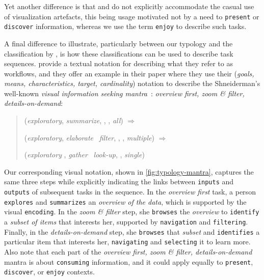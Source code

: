 Yet another difference is that \citet{Roth2013} and \citet{Schulz2013} do not explicitly accommodate the casual use of visualization artefacts, this being usage motivated not by a need to {\tt present} or {\tt discover} information, whereas we use the term {\tt enjoy} to describe such tasks.

A final difference to illustrate, particularly between our typology and the classification by \citet{Schulz2013}, is how these classifications can be used to describe task sequences.
\citet{Schulz2013} provide a textual notation for describing what they refer to as workflows, and they offer an example in their paper where they use their ({\it goals, means, characteristics, target, cardinality}) notation to describe the Shneiderman's well-known {\it visual information seeking mantra}~\cite{Shneiderman1996}: {\it overview first, zoom \& filter, details-on-demand}:

\begin{quotation}
    ({\it exploratory}, {\it summarize}, \textasteriskcentered, \textasteriskcentered, {\it all}) $\Rightarrow$
    
    ({\it exploratory}, {\it elaborate} \textbar~{\it filter}, \textasteriskcentered, \textasteriskcentered, {\it multiple}) $\Rightarrow$
    
    ({\it exploratory} , {\it gather} \textbar~{\it look-up}, \textasteriskcentered, {\it single})
\end{quotation}

Our corresponding visual notation, shown in \autoref{fig:typology-mantra}, captures the same three steps while explicitly indicating the links between {\tt inputs} and {\tt outputs} of subsequent tasks in the sequence.
In the {\it overview first} task, a person {\tt explores} and {\tt summarizes} an {\it overview of the data}, which is supported by the visual {\tt encoding}.
In the {\it zoom \& filter} step, she {\tt browses} the {\it overview} to {\tt identify} a {\it subset of items} that interests her, supported by {\tt navigation} and {\tt filtering}.
Finally, in the {\it details-on-demand} step, she {\tt browses} that {\it subset} and {\tt identifies} a particular item that interests her, {\tt navigating} and {\tt selecting} it to learn more.
Also note that each part of the {\it overview first, zoom \& filter, details-on-demand} mantra is about {\tt consuming} information, and it could apply equally to {\tt present}, {\tt discover}, or {\tt enjoy} contexts. 

